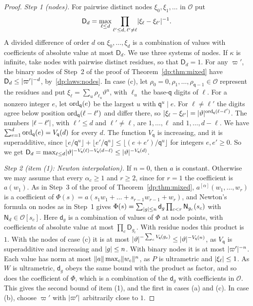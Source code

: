 \begin{proof}
\emph{Step 1 (nodes).} For pairwise distinct nodes $\xi_0,\xi_1,\dots$ in $\mathcal O$ put
\[
 \mathsf D_d=\max_{\ell\le d}\prod_{\ell'\le d,\,\ell'\ne\ell}\lvert \xi_\ell-\xi_{\ell'}\rvert^{-1}.
\]
A divided difference of order $d$ on $\xi_0,\dots,\xi_d$ is a combination of values with coefficients of absolute value at most $\mathsf D_d$. We use three systems of nodes. If $\kappa$ is infinite, take nodes with pairwise distinct residues, so that $\mathsf D_d=1$. For any $\varpi'$, the binary nodes of Step~2 of the proof of Theorem~\ref{dp:thm:mixed} have $\mathsf D_d\le\lvert \varpi'\rvert^{-d}$, by~\eqref{dp:laws:nodes}. In case (c), let $\rho_0=0,\rho_1,\dots,\rho_{\mathsf q-1}\in\mathcal O$ represent the residues and put $\xi_\ell=\sum_u\rho_{\ell_u}\vartheta^u$, with $\ell_u$ the base-$\mathsf q$ digits of $\ell$. For a nonzero integer $e$, let $\operatorname{ord}_{\mathsf q}(e)$ be the largest $u$ with $\mathsf q^u\mid e$. For $\ell\ne\ell'$ the digits agree below position $\operatorname{ord}_{\mathsf q}(\ell-\ell')$ and differ there, so $\lvert \xi_\ell-\xi_{\ell'}\rvert=\lvert \vartheta\rvert^{\operatorname{ord}_{\mathsf q}(\ell-\ell')}$. The numbers $\lvert \ell-\ell'\rvert$, with $\ell'\le d$ and $\ell'\ne\ell$, are $1,\dots,\ell$ and $1,\dots,d-\ell$. We have $\sum_{e=1}^d\operatorname{ord}_{\mathsf q}(e)=V_{\mathsf q}(d)$ for every $d$. The function $V_{\mathsf q}$ is increasing, and it is superadditive, since $\lfloor e/\mathsf q^u\rfloor+\lfloor e'/\mathsf q^u\rfloor\le\lfloor(e+e')/\mathsf q^u\rfloor$ for integers $e,e'\ge0$. So we get $\mathsf D_d=\max_{\ell\le d}\lvert \vartheta\rvert^{-V_{\mathsf q}(\ell)-V_{\mathsf q}(d-\ell)}\le\lvert \vartheta\rvert^{-V_{\mathsf q}(d)}$.

\emph{Step 2 (item (1): Newton interpolation).} If $n=0$, then $a$ is constant. Otherwise we may assume that every $\alpha_c\ge1$ and $r\ge2$, since for $r=1$ the coefficient is $a(w_1)$. As in Step~3 of the proof of Theorem~\ref{dp:thm:mixed}, $a^{[\alpha]}(w_1,\dots,w_r)$ is a coefficient of $\Phi(s)=a(s_1w_1+\dots+s_{r-1}w_{r-1}+w_r)$, and Newton's formula on nodes as in Step~1 gives $\Phi(s)=\sum_{\lvert g\rvert\le n}\mathsf d_g\prod_{c<r}\mathsf N_{g_c}(s_c)$ with $\mathsf N_d\in\mathcal O[s_c]$. Here $\mathsf d_g$ is a combination of values of $\Phi$ at node points, with coefficients of absolute value at most $\prod_c\mathsf D_{g_c}$. With residue nodes this product is $1$. With the nodes of case (c) it is at most $\lvert \vartheta\rvert^{-\sum_cV_{\mathsf q}(g_c)}\le\lvert \vartheta\rvert^{-V_{\mathsf q}(n)}$, as $V_{\mathsf q}$ is superadditive and increasing and $\lvert g\rvert\le n$. With binary nodes it is at most $\lvert \varpi'\rvert^{-n}$. Each value has norm at most $\lVert a\rVert\max_c\lVert w_c\rVert^n$, as $P$ is ultrametric and $\lvert \xi_\ell\rvert\le1$. As $W$ is ultrametric, $\mathsf d_g$ obeys the same bound with the product as factor, and so does the coefficient of $\Phi$, which is a combination of the $\mathsf d_g$ with coefficients in $\mathcal O$. This gives the second bound of item (1), and the first in cases (a) and (c). In case (b), choose $\varpi'$ with $\lvert \varpi'\rvert$ arbitrarily close to $1$.


\end{proof}
